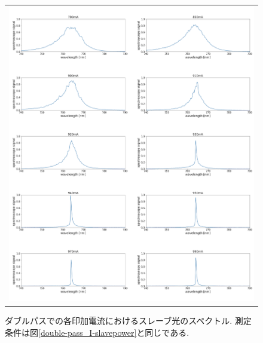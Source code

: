 \documentclass[uplatex, dvipdfmx, a4paper, report, papersize, 11pt]{jsbook}
\begin{document}
\begin{figure}[H]
\begin{tabular}{c}
      \begin{minipage}{1\hsize}
        \centering
          \includegraphics[keepaspectratio,  scale=0.340,  angle=0]
                          {figures/chapter4/double-pass-Slave-Spectrum.png}
                          \caption{ダブルパスでの各印加電流におけるスレーブ光のスペクトル. 測定条件は図\ref{double-pass_I-slavepower}と同じである. }
                          \label{double-pass_I-Slave}

      \end{minipage}


    \end{tabular}
\end{figure}
\end{document}
